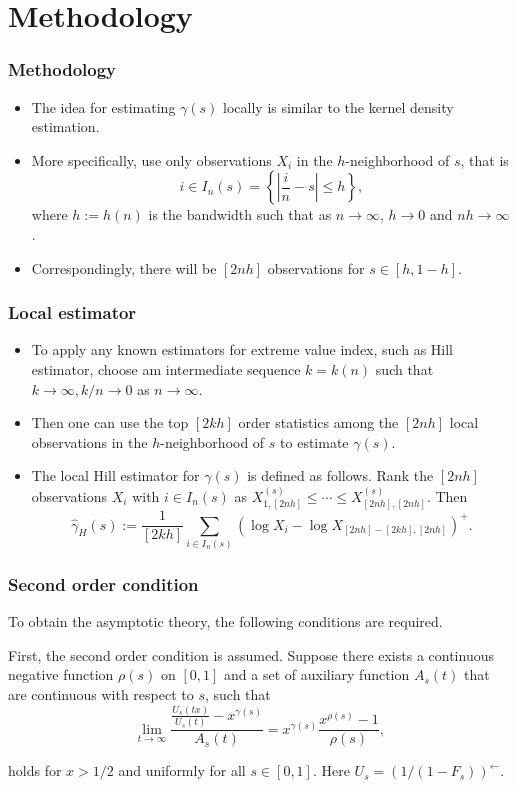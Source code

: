 \documentclass{beamer}
\newcommand{\abs}[1]{\left\vert#1\right\vert}
\newcommand{\set}[1]{\left\{#1\right\}}
\begin{document}
\section{Methodology}

\begin{frame}
    \frametitle{Methodology}
\begin{itemize}
    \item The idea for estimating $\gamma(s)$ locally is similar to the kernel density estimation.
    \medskip
    \item More specifically, use only observations $X_i$ in the $h$-neighborhood of $s$, that is 
    $$
i\in I_n(s)=\set{\abs{\frac{i}{n}-s}\le h},
    $$
    where $h:=h(n)$ is the bandwidth such that as $n\to \infty$, $h \to 0$ and $nh\to \infty$.
    \medskip
\item Correspondingly, there will be $[2nh]$ observations for $s\in [h,1-h]$.
\end{itemize}
\end{frame}

\begin{frame}
    \frametitle{Local estimator}
\begin{itemize}
    \item To apply any known estimators for extreme value index, such as Hill estimator, choose am intermediate sequence $k=k(n)$ such that $k\to \infty, k/n \to 0$ as $n \to \infty$.
    \item Then one can use the top $[2kh]$ order statistics among the $[2nh]$ local observations in the $h$-neighborhood of $s$ to estimate $\gamma(s)$.
    \item The local Hill estimator for $\gamma(s)$ is defined as follows. Rank the $[2nh]$ observations $X_i$ with $i \in I_n(s)$ as $X_{1,[2nh]}^{(s)}\le \cdots \le X_{[2nh],[2nh]}^{(s)}$. Then
    $$
    \hat{\gamma}_{H}(s):=\frac{1}{[2 k h]} \sum_{i \in I_{n}(s)}\left(\log X_{i}-\log X_{[2 n h]-[2 k h],[2 n h]}\right)^{+}.
    $$
\end{itemize}
\end{frame}







\begin{frame} 
    \frametitle{Second order condition}
To obtain the asymptotic theory, the following conditions are required.
   
\bigskip

First, the second order condition is assumed. Suppose there exists a continuous negative function $\rho(s)$ on $[0,1]$ and a set of auxiliary function $A_s(t)$ that are continuous with respect to $s$, such that
\begin{equation}\tag{3}
    \lim _{t \rightarrow \infty} \frac{\frac{U_{s}(t x)}{U_{s}(t)}-x^{\gamma(s)}}{A_{s}(t)}=x^{\gamma(s)} \frac{x^{\rho(s)}-1}{\rho(s)},   
\end{equation}


holds for $x>1/2$ and uniformly for all $s\in [0,1]$. Here $U_s = (1/(1-F_s))^{\leftarrow}$.
\end{frame}
\end{document}
